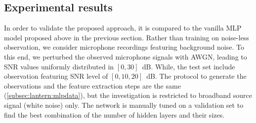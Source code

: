 \subsection{Experimental results}\label{subsec:lantern:simple:cnn:results}
In order to validate the proposed approach, it is compared to the vanilla \ac{MLP} model proposed above in the previous section.
Rather than training on noise-less observation, we consider microphone recordings featuring background noise.
To this end, we perturbed the observed microphone signals with \ac{AWGN}, leading to \ac{SNR} values uniformly distributed in $[0, 30]$~dB.
While, the test set include observation featuring \ac{SNR} level of $[0, 10, 20]$~dB.
The protocol to generate the observations and the feature extraction steps are the same (\cref{subsec:lantern:mlpdata}), but the investigation is restricted to broadband source signal (white noise) only.
The network is manually tuned on a validation set to find the best combination of the number of hidden layers and their sizes.

